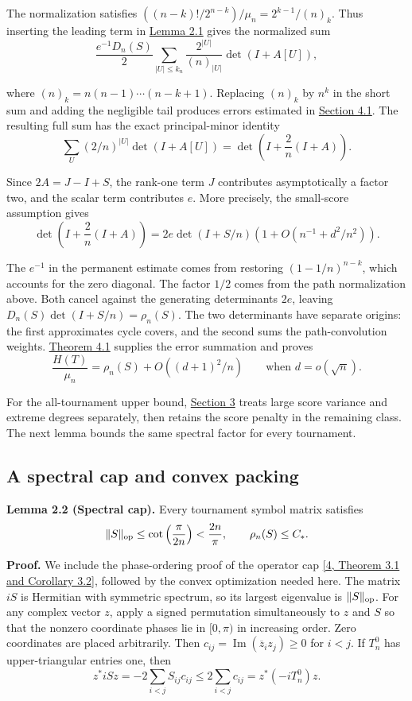 \documentclass[11pt,a4paper]{article}
\makeatletter
\newcommand{\paperstatement}[3]{\par\addvspace{6pt}\Needspace{4\baselineskip}\phantomsection\def\@currentlabel{#2}\label{#3}\noindent\textbf{#1}\enspace}
\newcommand{\paperref}[2]{\hyperref[#1]{#2}}
\makeatother
\begin{document}
The normalization satisfies \(((n-k)!/2^{n-k})/\mu_n=2^{k-1}/(n)_k\). Thus inserting the leading term in \paperref{thm-2.1}{Lemma 2.1} gives the normalized sum
\[\frac{e^{-1}D_n(S)}2
\sum_{|U|\le k_n}\frac{2^{|U|}}{(n)_{|U|}}\det(I+A[U]),\]

where \((n)_k=n(n-1)\cdots(n-k+1)\). Replacing \((n)_k\) by \(n^k\) in the short sum and adding the negligible tail produces errors estimated in \paperref{sec-4.1}{Section 4.1}. The resulting full sum has the exact principal-minor identity
\[\sum_U(2/n)^{|U|}\det(I+A[U])
=\det\left(I+\frac2n(I+A)\right).\]

Since \(2A=J-I+S\), the rank-one term \(J\) contributes asymptotically a factor two, and the scalar term contributes \(e\). More precisely, the small-score assumption gives
\[\det\left(I+\frac2n(I+A)\right)
=2e\det(I+S/n)\left(1+O(n^{-1}+d^2/n^2)\right).\]

The \(e^{-1}\) in the permanent estimate comes from restoring \((1-1/n)^{n-k}\), which accounts for the zero diagonal. The factor \(1/2\) comes from the path normalization above. Both cancel against the generating determinant\textquotesingle s \(2e\), leaving \(D_n(S)\det(I+S/n)=\rho_n(S)\). The two determinants have separate origins: the first approximates cycle covers, and the second sums the path-convolution weights. \paperref{thm-4.1}{Theorem 4.1} supplies the error summation and proves
\[\frac{H(T)}{\mu_n}=\rho_n(S)+O((d+1)^2/n)
\qquad\text{when }d=o(\sqrt n).\]

For the all-tournament upper bound, \paperref{sec-3}{Section 3} treats large score variance and extreme degrees separately, then retains the score penalty in the remaining class. The next lemma bounds the same spectral factor for every tournament.

\subsection{A spectral cap and convex packing}\label{sec-2.4}

\paperstatement{Lemma 2.2 (Spectral cap).}{2.2}{thm-2.2} Every tournament symbol matrix satisfies
\[\|S\|_{\rm op}\le\cot\left(\frac{\pi}{2n}\right)<\frac{2n}{\pi},
\qquad \rho_n(S)\le C_*.\]

\textbf{Proof.} We include the phase-ordering proof of the operator cap \paperref{bib-4}{[4, Theorem 3.1 and Corollary 3.2]}, followed by the convex optimization needed here. The matrix \(iS\) is Hermitian with symmetric spectrum, so its largest eigenvalue is \(\|S\|_{\rm op}\). For any complex vector \(z\), apply a signed permutation simultaneously to \(z\) and \(S\) so that the nonzero coordinate phases lie in \([0,\pi)\) in increasing order. Zero coordinates are placed arbitrarily. Then \(c_{ij}=\operatorname{Im}(\overline z_i z_j)\ge0\) for \(i<j\). If \(T_n^0\) has upper-triangular entries one, then
\[z^*iSz=-2\sum_{i<j}S_{ij}c_{ij}
\le2\sum_{i<j}c_{ij}=z^*(-iT_n^0)z.\]
\end{document}
